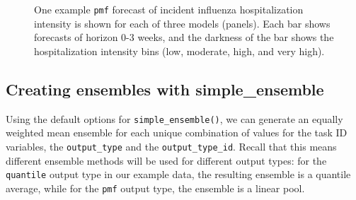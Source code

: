 \documentclass[
  article,
  shortnames,
  notitle]{jss}
\begin{document}
\begin{longtable}[]
\caption{\label{tbl-example-forecasts-pmf}Example \texttt{pmf} model
output for forecasts of incident influenza hospitalization intensity. A
subset of example model output is shown: 1-week ahead pmf forecasts made
on 2022-12-17 for the US from three distinct models. We round the
forecasted probability (in the \texttt{value} column) to two digits. The
\texttt{location} and \texttt{target\_end\_date} columns have been
omitted for brevity. This example data is provided in the
 package and is a subset of the
\texttt{example-complex-forecast-hub} data provided by the hubverse
\citep{hubverse_docs}.}

\tabularnewline
\end{longtable}

\begin{figure}


\caption{\label{fig-plot-ex-mods-pmf}One example \texttt{pmf} forecast
of incident influenza hospitalization intensity is shown for each of
three models (panels). Each bar shows forecasts of horizon 0-3 weeks,
and the darkness of the bar shows the hospitalization intensity bins
(low, moderate, high, and very high).}

\end{figure}%

\subsection{Creating ensembles with
simple\_ensemble}\label{creating-ensembles-with-simple_ensemble}

Using the default options for \texttt{simple\_ensemble()}, we can
generate an equally weighted mean ensemble for each unique combination
of values for the task ID variables, the \texttt{output\_type} and the
\texttt{output\_type\_id}. Recall that this means different ensemble
methods will be used for different output types: for the
\texttt{quantile} output type in our example data, the resulting
ensemble is a quantile average, while for the \texttt{pmf} output type,
the ensemble is a linear pool.
\end{document}
